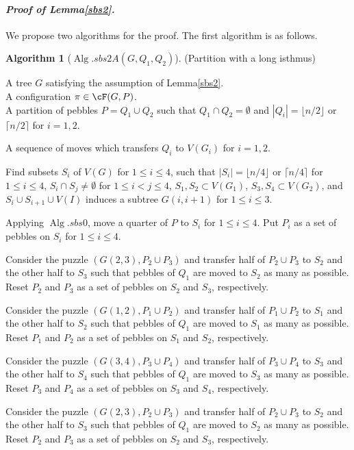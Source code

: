 \documentclass[letter,11pt]{article}
\newcommand{\white}{\qquad{\framebox{\rule{0pt}{4pt}}}}
\newcommand{\owari}{\hfill\white}
\theoremstyle{definition}
\theoremstyle{definition}
\newtheorem{alg}{Algorithm}
\DeclareMathOperator{\Alg}{Alg}
\newcommand{\1}{\boldmath$~1~$\unboldmath}
\newcommand{\qedgo}{\vspace{0.35cm}}
\newcommand{\tume}{\hspace*{0.2em}}
\newcommand{\maru}[1]{{\ooalign{\hfill$\small#1$\hfill\crcr\scalebox{1.3}{$\bigcirc$}}}}
\newenvironment{alg-enumerate}{%
  \begin{enumerate}%
   \renewcommand{\theenumi}{\arabic{enumi}}%
   \renewcommand{\labelenumi}{\rm{{\maru{\theenumi}}\tume\/}}%
   \renewcommand{\labelenumii}{\rm{$(${\maru{\theenumi}}-\theenumii$)$\tume\/}}%
 }{\end{enumerate}%
}
\newenvironment{Proofof}[1]{\expandafter
\paragraph{{\it Proof of #1.}}}{\hspace{5mm}\owari\qedgo}
\newcommand{\namelistlabel}[1]{\hspace*{10pt}\mbox{#1}:\hspace{\fill}}
\newenvironment{namelist}[1]{%
    \begin{list}{}
      {\let\makelabel\namelistlabel
      \settowidth{\labelwidth}{#1}
      \setlength{\leftmargin}{1.1\labelwidth}
      \setlength{\labelsep}{5pt}
      \setlength{\parsep}{0pt}}
  }{%
  \end{list}}
\begin{document}
\begin{Proofof}{Lemma\tume\ref{sbs2}}
We propose two algorithms for the proof.
The first algorithm is as follows. 

\begin{alg}[$\Alg.sbs2A(G, Q_1, Q_2)$](Partition with a long isthmus)\hfill
\begin{namelist}{OUTPUT}
\item[\sl Input]{A tree $G$ satisfying the assumption of Lemma\tume\ref{sbs2}.\\
A configuration $\pi \in \cF(G, P)$.\\
A partition of pebbles $P = Q_1 \cup Q_2$ such that $Q_1 \cap Q_2 = \emptyset$ and $|Q_i| = \lfloor n/2 \rfloor$ or $\lceil n/2 \rceil$ for $i=1, 2$.  
}
\item[\sl Output]{A sequence of moves which transfers $Q_i$ to $V(G_i)$ for $i = 1, 2$.}
\end{namelist}
\begin{alg-enumerate}
\item Find subsets $S_i$ of $V(G)$ for $1 \le i \le 4$, such that $|S_i| = \lfloor n/4 \rfloor$ or $\lceil n/4 \rceil$ for $1 \le i \le 4$, $S_i \cap S_j \ne \emptyset$ for $1 \le i < j \le 4$, $S_1, S_2 \subset V(G_1)$, $S_3, S_4 \subset V(G_2)$, and $S_i \cup S_{i+1} \cup V(I)$ induces a subtree $G(i, i+1)$ for $1 \le i \le 3$.
\item Applying $\Alg.sbs0$, move a quarter of $P$ to $S_i$ for $1 \le i \le 4$.
Put $P_i$ as a set of pebbles on $S_i$ for $1 \le i \le 4$.
\item Consider the puzzle $(G(2,3), P_2 \cup P_3)$ and transfer half of $P_2 \cup P_3$ to $S_2$ and the other half to $S_3$ such that pebbles of $Q_1$ are moved to $S_2$ as many as possible.
Reset $P_2$ and $P_3$ as a set of pebbles on $S_2$ and $S_3$, respectively.
\item Consider the puzzle $(G(1,2), P_1 \cup P_2)$ and transfer half of $P_1 \cup P_2$ to $S_1$ and the other half to $S_2$ such that pebbles of $Q_1$ are moved to $S_1$ as many as possible.
Reset $P_1$ and $P_2$ as a set of pebbles on $S_1$ and $S_2$, respectively.
\item Consider the puzzle $(G(3,4), P_3 \cup P_4)$ and transfer half of $P_3 \cup P_4$ to $S_3$ and the other half to $S_4$ such that pebbles of $Q_1$ are moved to $S_3$ as many as possible.
Reset $P_3$ and $P_4$ as a set of pebbles on $S_3$ and $S_4$, respectively.
\item Consider the puzzle $(G(2,3), P_2 \cup P_3)$ and transfer half of $P_2 \cup P_3$ to $S_2$ and the other half to $S_3$ such that pebbles of $Q_1$ are moved to $S_2$ as many as possible.
Reset $P_2$ and $P_3$ as a set of pebbles on $S_2$ and $S_3$, respectively.
\end{alg-enumerate}
\end{alg}


\end{Proofof}
\end{document}
